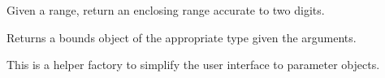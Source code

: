 \documentclass[letterpaper,10pt,english]{sphinxmanual}
\begin{document}

\begin{fulllineitems}
\label{api/mystic.bounds:refl1d.mystic.bounds.nice_range}
Given a range, return an enclosing range accurate to two digits.

\end{fulllineitems}


\begin{fulllineitems}
\label{api/mystic.bounds:refl1d.mystic.bounds.init_bounds}
Returns a bounds object of the appropriate type given the arguments.

This is a helper factory to simplify the user interface to parameter
objects.

\end{fulllineitems}

\end{document}
